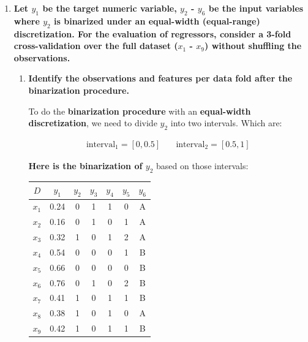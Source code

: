 \documentclass[12pt]{article}
\begin{document}
\begin{enumerate}[leftmargin=\labelsep]
  \item \textbf{Let $y_1$ be the target numeric variable, $y_2$ - $y_6$ be the input variables where $y_2$ is binarized under an
          equal-width (equal-range) discretization. For the evaluation of regressors, consider a 3-fold
          cross-validation over the full dataset ($x_1$ - $x_9$) without shuffling the observations.}
        \begin{enumerate}
          \item \textbf{Identify the observations and features per data fold after the binarization procedure.}

                \vskip 0.3cm
                To do the \textbf{binarization procedure} with an \textbf{equal-width discretization}, we need to divide $y_2$ into two intervals. Which are:

                \[
                  \begin{array}{cc}
                    \text{interval}_1 = [0, 0.5] & \quad
                    \text{interval}_2 = [0.5, 1]
                  \end{array}
                \]

                \textbf{Here is the binarization of $y_2$} based on those intervals:
                \begin{center}
                  \begin{tabular}{c|cccccc}
                    \(D\)   & \(y_1\) & \(y_2\) & \(y_3\) & \(y_4\) & \(y_5\) & \(y_6\) \\
                    \hline
                    \(x_1\) & 0.24    & 0       & 1       & 1       & 0       & A       \\
                    \(x_2\) & 0.16    & 0       & 1       & 0       & 1       & A       \\
                    \(x_3\) & 0.32    & 1       & 0       & 1       & 2       & A       \\
                    \(x_4\) & 0.54    & 0       & 0       & 0       & 1       & B       \\
                    \(x_5\) & 0.66    & 0       & 0       & 0       & 0       & B       \\
                    \(x_6\) & 0.76    & 0       & 1       & 0       & 2       & B       \\
                    \(x_7\) & 0.41    & 1       & 0       & 1       & 1       & B       \\
                    \(x_8\) & 0.38    & 1       & 0       & 1       & 0       & A       \\
                    \(x_9\) & 0.42    & 1       & 0       & 1       & 1       & B       \\
                  \end{tabular}
                \end{center}


\end{enumerate}
\end{enumerate}
\end{document}
